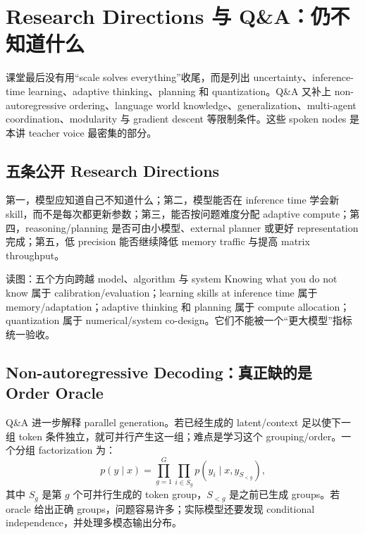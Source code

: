 \section{Research Directions 与 Q\&A：仍不知道什么}

课堂最后没有用“scale solves everything”收尾，而是列出 uncertainty、inference-time learning、adaptive thinking、planning 和 quantization。Q\&A 又补上 non-autoregressive ordering、language world knowledge、generalization、multi-agent coordination、modularity 与 gradient descent 等限制条件。这些 spoken nodes 是本讲 teacher voice 最密集的部分。

\subsection{五条公开 Research Directions}

第一，模型应知道自己不知道什么；第二，模型能否在 inference time 学会新 skill，而不是每次都更新参数；第三，能否按问题难度分配 adaptive compute；第四，reasoning/planning 是否可由小模型、external planner 或更好 representation 完成；第五，低 precision 能否继续降低 memory traffic 与提高 matrix throughput。


\begin{knowledgebox}{读图：五个方向跨越 model、algorithm 与 system}
Knowing what you do not know 属于 calibration/evaluation；learning skills at inference time 属于 memory/adaptation；adaptive thinking 和 planning 属于 compute allocation；quantization 属于 numerical/system co-design。它们不能被一个“更大模型”指标统一验收。
\end{knowledgebox}


\subsection{Non-autoregressive Decoding：真正缺的是 Order Oracle}

Q\&A 进一步解释 parallel generation。若已经生成的 latent/context 足以使下一组 token 条件独立，就可并行产生这一组；难点是学习这个 grouping/order。一个分组 factorization 为：
\[
p(y\mid x)=\prod_{g=1}^{G}\prod_{i\in S_g}p\!\left(y_i\mid x,y_{S_{<g}}\right),
\]
其中 $S_g$ 是第 $g$ 个可并行生成的 token group，$S_{<g}$ 是之前已生成 groups。若 oracle 给出正确 groups，问题容易许多；实际模型还要发现 conditional independence，并处理多模态输出分布。

